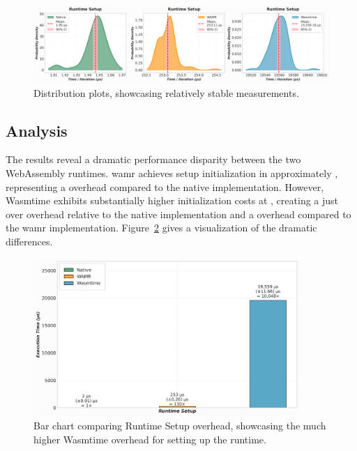 \begin{figure}[h]
    \centering
    \includegraphics[width=\textwidth]{images/setup-distribution}
    \caption{Distribution plots, showcasing relatively stable measurements.}
    \label{fig:wasm-setup-distribution}
\end{figure}

\subsection{Analysis}
The results reveal a dramatic performance disparity between the two WebAssembly runtimes. \acrshort{wamr} achieves setup initialization in approximately , representing a  overhead compared to the native implementation. However, Wasmtime exhibits substantially higher initialization costs at , creating a just over  overhead relative to the native implementation and a  overhead compared to the \acrshort{wamr} implementation. Figure~\ref{fig:wasm-setup-relative} gives a visualization of the dramatic differences.

\begin{figure}[h]
    \centering
    \includegraphics[width=0.9\textwidth]{images/setup_bars}
    \caption{Bar chart comparing Runtime Setup overhead, showcasing the much higher Wasmtime overhead for setting up the runtime.}
    \label{fig:wasm-setup-relative}
\end{figure}

